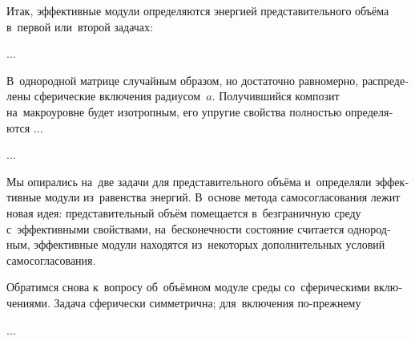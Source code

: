 
\begin{otherlanguage}{russian}

Итак, эффективные модули определяются энергией представительного объёма в~первой или~второй задачах:

...



\end{otherlanguage}



\begin{otherlanguage}{russian}

В~однородной матрице случайным образом, но достаточно равномерно, распределены сферические включения радиусом~$a$. Получившийся композит на~макроуровне будет изотропным, его упругие свойства полностью определяются ...

...



\end{otherlanguage}



\begin{otherlanguage}{russian}

Мы опирались на~две задачи для представительного объёма и~определяли эффективные модули из~равенства энергий. В~\hbox{основе} метода самосогласования лежит новая идея: представительный объём помещается в~безграничную среду с~эффективными свойствами, на~бесконечности состояние считается однородным, эффективные модули находятся из~некоторых дополнительных условий самосогласования.

Обратимся снова к~вопросу об~объёмном модуле среды со~сферическими включениями. Задача сферически симметрична; для~включения по\hbox{-}прежнему

...



\end{otherlanguage}

